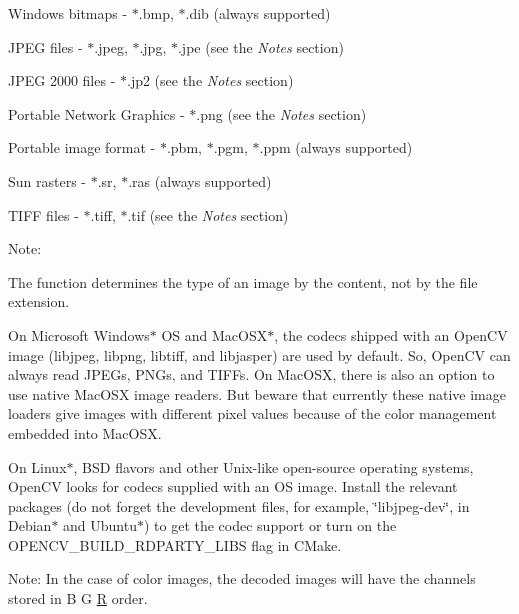 \begin{DoxyItemize}
\item Windows bitmaps -\/ {\ttfamily $\ast$.bmp, $\ast$.dib} (always supported) 
\item J\+P\+EG files -\/ {\ttfamily $\ast$.jpeg, $\ast$.jpg, $\ast$.jpe} (see the {\itshape Notes} section) 
\item J\+P\+EG 2000 files -\/ {\ttfamily $\ast$.jp2} (see the {\itshape Notes} section) 
\item Portable Network Graphics -\/ {\ttfamily $\ast$.png} (see the {\itshape Notes} section) 
\item Portable image format -\/ {\ttfamily $\ast$.pbm, $\ast$.pgm, $\ast$.ppm} (always supported) 
\item Sun rasters -\/ {\ttfamily $\ast$.sr, $\ast$.ras} (always supported) 
\item T\+I\+FF files -\/ {\ttfamily $\ast$.tiff, $\ast$.tif} (see the {\itshape Notes} section) 
\end{DoxyItemize}

Note\+:


\begin{DoxyItemize}
\item The function determines the type of an image by the content, not by the file extension. 
\item On Microsoft Windows$\ast$ OS and Mac\+O\+S\+X$\ast$, the codecs shipped with an Open\+CV image (libjpeg, libpng, libtiff, and libjasper) are used by default. So, Open\+CV can always read J\+P\+E\+Gs, P\+N\+Gs, and T\+I\+F\+Fs. On Mac\+O\+SX, there is also an option to use native Mac\+O\+SX image readers. But beware that currently these native image loaders give images with different pixel values because of the color management embedded into Mac\+O\+SX. 
\item On Linux$\ast$, B\+SD flavors and other Unix-\/like open-\/source operating systems, Open\+CV looks for codecs supplied with an OS image. Install the relevant packages (do not forget the development files, for example, \char`\"{}libjpeg-\/dev\char`\"{}, in Debian$\ast$ and Ubuntu$\ast$) to get the codec support or turn on the {\ttfamily O\+P\+E\+N\+C\+V\+\_\+\+B\+U\+I\+L\+D\+\_\+R\+D\+P\+A\+R\+T\+Y\+\_\+\+L\+I\+BS} flag in C\+Make. 
\end{DoxyItemize}

Note\+: In the case of color images, the decoded images will have the channels stored in {\ttfamily B G \mbox{\hyperlink{classorg_1_1opencv_1_1_r}{R}}} order.


